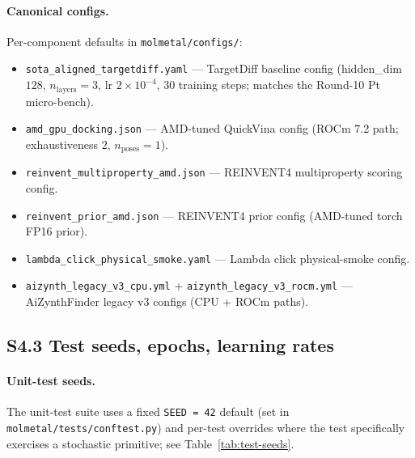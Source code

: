 \paragraph{Canonical configs.}
Per-component defaults in \texttt{molmetal/configs/}:
\begin{itemize}
  \item \texttt{sota\_aligned\_targetdiff.yaml} --- TargetDiff
        baseline config (hidden\_dim $128$, $n_{\mathrm{layers}} = 3$,
        lr $2 \times 10^{-4}$, $30$ training steps; matches the
        Round-10 Pt micro-bench).
  \item \texttt{amd\_gpu\_docking.json} --- AMD-tuned QuickVina
        config (ROCm 7.2 path; exhaustiveness $2$, $n_{\mathrm{poses}}
        = 1$).
  \item \texttt{reinvent\_multiproperty\_amd.json} --- REINVENT4
        multiproperty scoring config.
  \item \texttt{reinvent\_prior\_amd.json} --- REINVENT4 prior
        config (AMD-tuned torch FP16 prior).
  \item \texttt{lambda\_click\_physical\_smoke.yaml} --- Lambda
        click physical-smoke config.
  \item \texttt{aizynth\_legacy\_v3\_cpu.yml} +
        \texttt{aizynth\_legacy\_v3\_rocm.yml} --- AiZynthFinder
        legacy v3 configs (CPU + ROCm paths).
\end{itemize}

\subsection*{S4.3 Test seeds, epochs, learning rates}
\label{supp:s4-test-params}

\paragraph{Unit-test seeds.}
The unit-test suite uses a fixed \texttt{SEED = 42} default (set in
\texttt{molmetal/tests/conftest.py}) and per-test overrides where
the test specifically exercises a stochastic primitive; see
Table~\ref{tab:test-seeds}.

